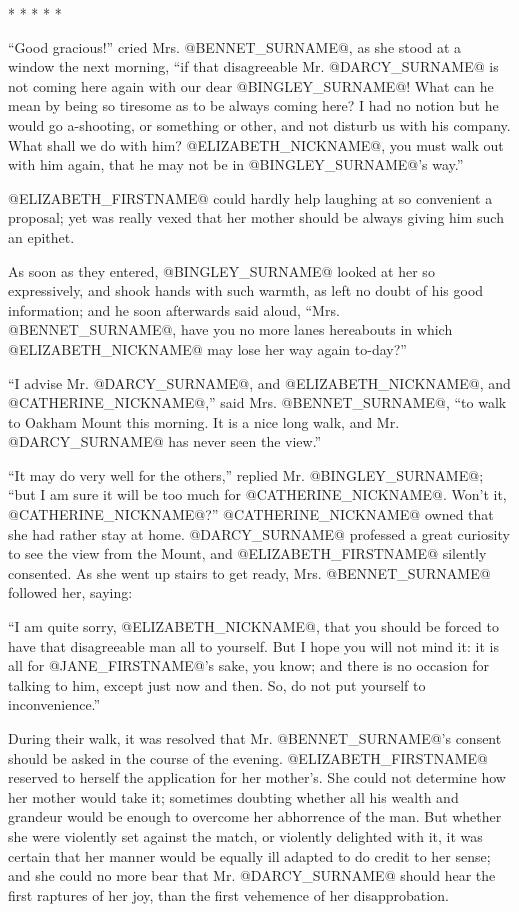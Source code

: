                           * * * * *

``Good gracious!'' cried Mrs. @BENNET_SURNAME@, as she stood at a window the next
morning, ``if that disagreeable Mr. @DARCY_SURNAME@ is not coming here again with
our dear @BINGLEY_SURNAME@! What can he mean by being so tiresome as to be always
coming here? I had no notion but he would go a-shooting, or something or
other, and not disturb us with his company. What shall we do with him?
@ELIZABETH_NICKNAME@, you must walk out with him again, that he may not be in @BINGLEY_SURNAME@'s
way.''

@ELIZABETH_FIRSTNAME@ could hardly help laughing at so convenient a proposal; yet
was really vexed that her mother should be always giving him such an
epithet.

As soon as they entered, @BINGLEY_SURNAME@ looked at her so expressively, and
shook hands with such warmth, as left no doubt of his good information;
and he soon afterwards said aloud, ``Mrs. @BENNET_SURNAME@, have you no more lanes
hereabouts in which @ELIZABETH_NICKNAME@ may lose her way again to-day?''

``I advise Mr. @DARCY_SURNAME@, and @ELIZABETH_NICKNAME@, and @CATHERINE_NICKNAME@,'' said Mrs. @BENNET_SURNAME@, ``to walk
to Oakham Mount this morning. It is a nice long walk, and Mr. @DARCY_SURNAME@ has
never seen the view.''

``It may do very well for the others,'' replied Mr. @BINGLEY_SURNAME@; ``but I am
sure it will be too much for @CATHERINE_NICKNAME@. Won't it, @CATHERINE_NICKNAME@?'' @CATHERINE_NICKNAME@ owned that
she had rather stay at home. @DARCY_SURNAME@ professed a great curiosity to see
the view from the Mount, and @ELIZABETH_FIRSTNAME@ silently consented. As she went
up stairs to get ready, Mrs. @BENNET_SURNAME@ followed her, saying:

``I am quite sorry, @ELIZABETH_NICKNAME@, that you should be forced to have that
disagreeable man all to yourself. But I hope you will not mind it: it is
all for @JANE_FIRSTNAME@'s sake, you know; and there is no occasion for talking
to him, except just now and then. So, do not put yourself to
inconvenience.''

During their walk, it was resolved that Mr. @BENNET_SURNAME@'s consent should be
asked in the course of the evening. @ELIZABETH_FIRSTNAME@ reserved to herself the
application for her mother's. She could not determine how her mother
would take it; sometimes doubting whether all his wealth and grandeur
would be enough to overcome her abhorrence of the man. But whether she
were violently set against the match, or violently delighted with it, it
was certain that her manner would be equally ill adapted to do credit
to her sense; and she could no more bear that Mr. @DARCY_SURNAME@ should hear
the first raptures of her joy, than the first vehemence of her
disapprobation.

